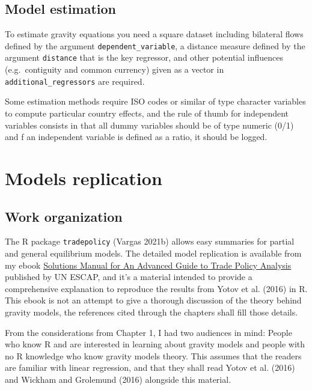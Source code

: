 \documentclass[12pt,reqno,oneside,pdftex]{formato-puc/puctesis} %
\begin{document}
\hypertarget{model-estimation}{%
\subsection{Model estimation}\label{model-estimation}}

To estimate gravity equations you need a square dataset including
bilateral flows defined by the argument \texttt{dependent\_variable}, a
distance measure defined by the argument \texttt{distance} that is the
key regressor, and other potential influences (e.g.~contiguity and
common currency) given as a vector in \texttt{additional\_regressors}
are required.

Some estimation methods require ISO codes or similar of type character
variables to compute particular country effects, and the rule of thumb
for independent variables consists in that all dummy variables should be
of type numeric (0/1) and f an independent variable is defined as a
ratio, it should be logged.

\hypertarget{models-replication}{%
\section{Models replication}\label{models-replication}}

\hypertarget{work-organization}{%
\subsection{Work organization}\label{work-organization}}

The R package \texttt{tradepolicy} (Vargas 2021b) allows easy summaries
for partial and general equilibrium models. The detailed model
replication is available from my ebook
\href{https://r.tiid.org/R_structural_gravity/}{Solutions Manual for An
Advanced Guide to Trade Policy Analysis} published by UN ESCAP, and it's
a material intended to provide a comprehensive explanation to reproduce
the results from Yotov et al. (2016) in R. This ebook is not an attempt
to give a thorough discussion of the theory behind gravity models, the
references cited through the chapters shall fill those details.

From the considerations from Chapter 1, I had two audiences in mind:
People who know R and are interested in learning about gravity models
and people with no R knowledge who know gravity models theory. This
assumes that the readers are familiar with linear regression, and that
they shall read Yotov et al. (2016) and Wickham and Grolemund (2016)
alongside this material.
\end{document}
